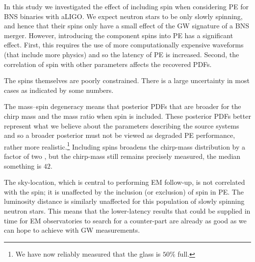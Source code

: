 In this study we investigated the effect of including spin when considering PE for BNS binaries with aLIGO. We expect neutron stars to be only slowly spinning, and hence that their spins only have a small effect of the GW signature of a BNS merger. However, introducing the component spins into PE has a significant effect. First, this requires the use of more computationally expensive waveforms (that include more physics) and so the latency of PE is increased. Second, the correlation of spin with other parameters affects the recovered PDFs.

The spins themselves are poorly constrained. There is a large uncertainty in most cases as indicated by some numbers.

The mass--spin degeneracy means that posterior PDFs that are broader for the chirp mass and the mass ratio when spin is included. These posterior PDFs better represent what we believe about the parameters describing the source systems and so a broader posterior must not be viewed as degraded PE performance, rather more realistic.\footnote{We have now reliably measured that the glass is $50\%$ full.} Including spins broadens the chirp-mass distribution by a factor of two \citep{Poisson_1995,Berry_2014}, but the chirp-mass still remains precisely measured, the median something is $42$.

The sky-location, which is central to performing EM follow-up, is not correlated with the spin; it is unaffected by the inclusion (or exclusion) of spin in PE. The luminosity distance is similarly unaffected for this population of slowly spinning neutron stars. This means that the lower-latency results that could be supplied in time for EM observatories to search for a counter-part are already as good as we can hope to achieve with GW measurements.